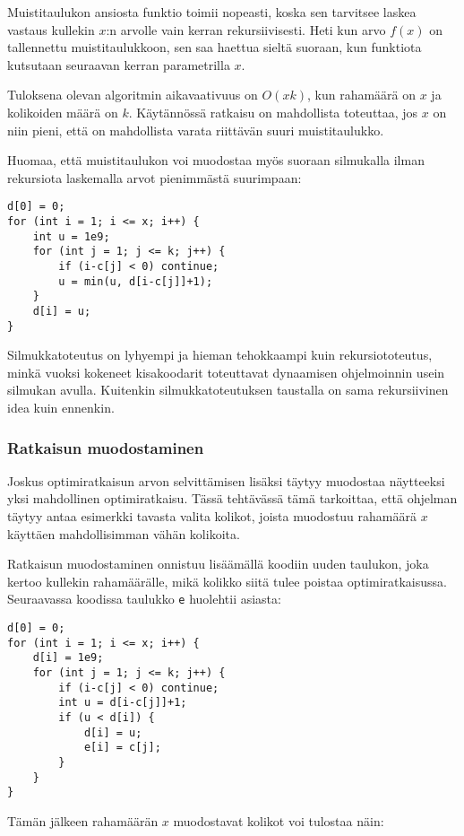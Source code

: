 Muistitaulukon ansiosta funktio toimii
nopeasti, koska sen tarvitsee laskea
vastaus kullekin $x$:n arvolle
vain kerran rekursiivisesti.
Heti kun arvo $f(x)$ on tallennettu muistitaulukkoon,
sen saa haettua sieltä suoraan,
kun funktiota kutsutaan seuraavan kerran parametrilla $x$.

Tuloksena olevan algoritmin aikavaativuus on $O(xk)$,
kun rahamäärä on $x$ ja kolikoiden määrä on $k$.
Käytännössä ratkaisu on mahdollista toteuttaa,
jos $x$ on niin pieni, että on mahdollista varata 
riittävän suuri muistitaulukko.

Huomaa, että muistitaulukon voi muodostaa
myös suoraan silmukalla ilman rekursiota
laskemalla arvot pienimmästä suurimpaan:
\begin{lstlisting}
d[0] = 0;
for (int i = 1; i <= x; i++) {
    int u = 1e9;
    for (int j = 1; j <= k; j++) {
        if (i-c[j] < 0) continue;
        u = min(u, d[i-c[j]]+1);
    }
    d[i] = u;
}
\end{lstlisting}

Silmukkatoteutus on lyhyempi ja
hieman tehokkaampi kuin rekursiototeutus,
minkä vuoksi kokeneet kisakoodarit
toteuttavat dynaamisen ohjelmoinnin
usein silmukan avulla.
Kuitenkin silmukkatoteutuksen taustalla
on sama rekursiivinen idea kuin ennenkin.

\subsubsection{Ratkaisun muodostaminen}

Joskus optimiratkaisun arvon selvittämisen lisäksi
täytyy muodostaa näytteeksi yksi mahdollinen optimiratkaisu.
Tässä tehtävässä tämä tarkoittaa,
että ohjelman täytyy antaa esimerkki
tavasta valita kolikot,
joista muodostuu rahamäärä $x$
käyttäen mahdollisimman vähän kolikoita.

Ratkaisun muodostaminen onnistuu lisäämällä
koodiin uuden taulukon, joka kertoo
kullekin rahamäärälle,
mikä kolikko siitä tulee poistaa
optimiratkaisussa.
Seuraavassa koodissa taulukko \texttt{e}
huolehtii asiasta:

\begin{lstlisting}
d[0] = 0;
for (int i = 1; i <= x; i++) {
    d[i] = 1e9;
    for (int j = 1; j <= k; j++) {
        if (i-c[j] < 0) continue;
        int u = d[i-c[j]]+1;
        if (u < d[i]) {
            d[i] = u;
            e[i] = c[j];
        }
    }
}
\end{lstlisting}

Tämän jälkeen rahamäärän $x$ muodostavat
kolikot voi tulostaa näin:

